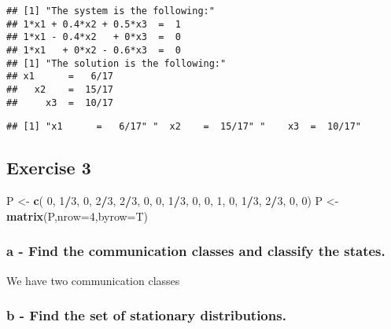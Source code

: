 \documentclass[]{article}
\newenvironment{Shaded}{\begin{snugshade}}{\end{snugshade}}
\newcommand{\DataTypeTok}[1]{\textcolor[rgb]{0.13,0.29,0.53}{#1}}
\newcommand{\DecValTok}[1]{\textcolor[rgb]{0.00,0.00,0.81}{#1}}
\newcommand{\KeywordTok}[1]{\textcolor[rgb]{0.13,0.29,0.53}{\textbf{#1}}}
\newcommand{\NormalTok}[1]{#1}
\newcommand{\OperatorTok}[1]{\textcolor[rgb]{0.81,0.36,0.00}{\textbf{#1}}}
\newcommand{\StringTok}[1]{\textcolor[rgb]{0.31,0.60,0.02}{#1}}
\begin{document}
\begin{verbatim}
## [1] "The system is the following:"
## 1*x1 + 0.4*x2 + 0.5*x3  =  1 
## 1*x1 - 0.4*x2   + 0*x3  =  0 
## 1*x1   + 0*x2 - 0.6*x3  =  0 
## [1] "The solution is the following:"
## x1      =   6/17 
##   x2    =  15/17 
##     x3  =  10/17
\end{verbatim}

\begin{verbatim}
## [1] "x1      =   6/17" "  x2    =  15/17" "    x3  =  10/17"
\end{verbatim}

\hypertarget{exercise-3}{%
\subsection{Exercise 3}\label{exercise-3}}

\begin{Shaded}
\begin{Highlighting}[]
\NormalTok{P <-}\StringTok{ }\KeywordTok{c}\NormalTok{(  }\DecValTok{0}\NormalTok{, }\DecValTok{1}\OperatorTok{/}\DecValTok{3}\NormalTok{,   }\DecValTok{0}\NormalTok{, }\DecValTok{2}\OperatorTok{/}\DecValTok{3}\NormalTok{,}
       \DecValTok{2}\OperatorTok{/}\DecValTok{3}\NormalTok{,   }\DecValTok{0}\NormalTok{,   }\DecValTok{0}\NormalTok{, }\DecValTok{1}\OperatorTok{/}\DecValTok{3}\NormalTok{,}
         \DecValTok{0}\NormalTok{,   }\DecValTok{0}\NormalTok{,   }\DecValTok{1}\NormalTok{,   }\DecValTok{0}\NormalTok{,}
       \DecValTok{1}\OperatorTok{/}\DecValTok{3}\NormalTok{, }\DecValTok{2}\OperatorTok{/}\DecValTok{3}\NormalTok{,   }\DecValTok{0}\NormalTok{,   }\DecValTok{0}\NormalTok{)}
\NormalTok{P <-}\StringTok{ }\KeywordTok{matrix}\NormalTok{(P,}\DataTypeTok{nrow=}\DecValTok{4}\NormalTok{,}\DataTypeTok{byrow=}\NormalTok{T)}
\end{Highlighting}
\end{Shaded}

\hypertarget{a---find-the-communication-classes-and-classify-the-states.}{%
\subsubsection{a - Find the communication classes and classify the
states.}\label{a---find-the-communication-classes-and-classify-the-states.}}

We have two communication classes

\hypertarget{b---find-the-set-of-stationary-distributions.}{%
\subsubsection{b - Find the set of stationary
distributions.}\label{b---find-the-set-of-stationary-distributions.}}
\end{document}

